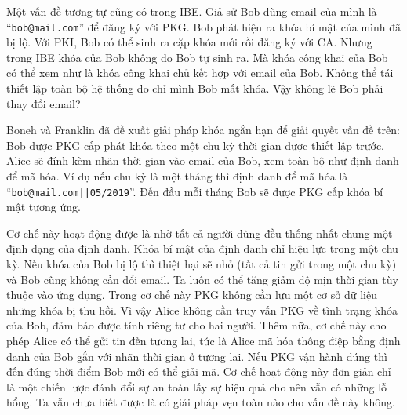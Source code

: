 \documentclass[class=report, crop=false]{standalone}
\begin{document}
			Một vấn đề tương tự cũng có trong IBE. Giả sử Bob dùng email của mình là ``\texttt{bob@mail.com}'' để đăng ký với PKG. Bob phát hiện ra khóa bí mật của mình đã bị lộ. Với PKI, Bob có thể sinh ra cặp khóa mới rồi đăng ký với CA. Nhưng trong IBE khóa của Bob không do Bob tự sinh ra. Mà khóa công khai của Bob có thể xem như là khóa công khai chủ kết hợp với email của Bob. Không thể tái thiết lập toàn bộ hệ thống do chỉ mình Bob mất khóa. Vậy không lẽ Bob phải thay đổi email?

			Boneh và Franklin \cite{DBLP:conf/crypto/BonehF01} đã đề xuất giải pháp khóa ngắn hạn để giải quyết vấn đề trên: Bob được PKG cấp phát khóa theo một chu kỳ thời gian được thiết lập trước. Alice sẽ đính kèm nhãn thời gian vào email của Bob, xem toàn bộ như định danh để mã hóa. Ví dụ nếu chu kỳ là một tháng thì định danh để mã hóa là ``\texttt{bob@mail.com||05/2019}''. Đến đầu mỗi tháng Bob sẽ được PKG cấp khóa bí mật tương ứng.
			
			Cơ chế này hoạt động được là nhờ tất cả người dùng đều thống nhất chung một định dạng của định danh. Khóa bí mật của định danh chỉ hiệu lực trong một chu kỳ. Nếu khóa của Bob bị lộ thì thiệt hại sẽ nhỏ (tất cả tin gửi trong một chu kỳ) và Bob cũng không cần đổi email. Ta luôn có thể tăng giảm độ mịn thời gian tùy thuộc vào ứng dụng. Trong cơ chế này PKG không cần lưu một cơ sở dữ liệu những khóa bị thu hồi. Vì vậy Alice không cần truy vấn PKG về tình trạng khóa của Bob, đảm bảo được tính riêng tư cho hai người. Thêm nữa, cơ chế này cho phép Alice có thể gửi tin đến tương lai, tức là Alice mã hóa thông điệp bằng định danh của Bob gắn với nhãn thời gian ở tương lai. Nếu PKG vận hành đúng thì đến đúng thời điểm Bob mới có thể giải mã. Cơ chế hoạt động này đơn giản chỉ là một chiến lược đánh đổi sự an toàn lấy sự hiệu quả cho nên vẫn có những lỗ hổng. Ta vẫn chưa biết được là có giải pháp vẹn toàn nào cho vấn đề này không.
	\newpage
\end{document}
